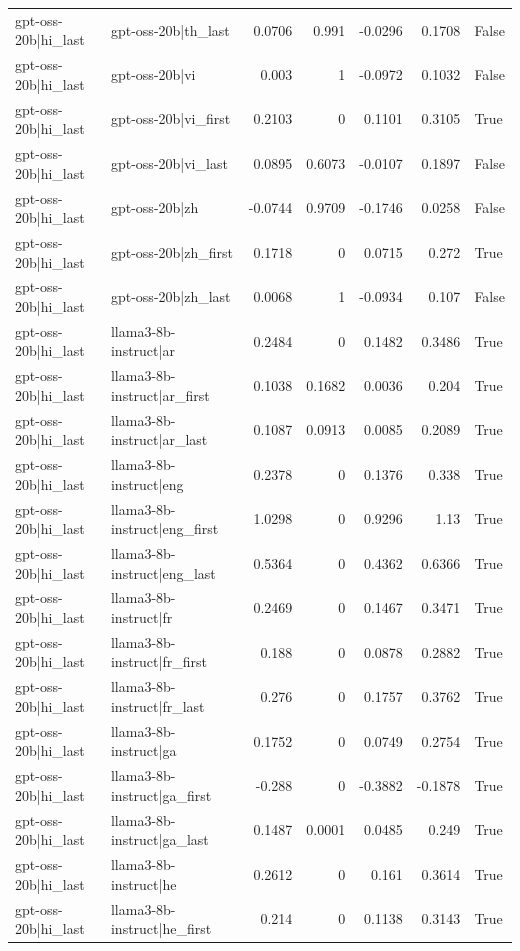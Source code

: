\begin{table}
\begin{tabular}{l l r r r r l}
gpt-oss-20b|hi_last & gpt-oss-20b|th_last & 0.0706 & 0.991 & -0.0296 & 0.1708 & False \\
gpt-oss-20b|hi_last & gpt-oss-20b|vi & 0.003 & 1 & -0.0972 & 0.1032 & False \\
gpt-oss-20b|hi_last & gpt-oss-20b|vi_first & 0.2103 & 0 & 0.1101 & 0.3105 & True \\
gpt-oss-20b|hi_last & gpt-oss-20b|vi_last & 0.0895 & 0.6073 & -0.0107 & 0.1897 & False \\
gpt-oss-20b|hi_last & gpt-oss-20b|zh & -0.0744 & 0.9709 & -0.1746 & 0.0258 & False \\
gpt-oss-20b|hi_last & gpt-oss-20b|zh_first & 0.1718 & 0 & 0.0715 & 0.272 & True \\
gpt-oss-20b|hi_last & gpt-oss-20b|zh_last & 0.0068 & 1 & -0.0934 & 0.107 & False \\
gpt-oss-20b|hi_last & llama3-8b-instruct|ar & 0.2484 & 0 & 0.1482 & 0.3486 & True \\
gpt-oss-20b|hi_last & llama3-8b-instruct|ar_first & 0.1038 & 0.1682 & 0.0036 & 0.204 & True \\
gpt-oss-20b|hi_last & llama3-8b-instruct|ar_last & 0.1087 & 0.0913 & 0.0085 & 0.2089 & True \\
gpt-oss-20b|hi_last & llama3-8b-instruct|eng & 0.2378 & 0 & 0.1376 & 0.338 & True \\
gpt-oss-20b|hi_last & llama3-8b-instruct|eng_first & 1.0298 & 0 & 0.9296 & 1.13 & True \\
gpt-oss-20b|hi_last & llama3-8b-instruct|eng_last & 0.5364 & 0 & 0.4362 & 0.6366 & True \\
gpt-oss-20b|hi_last & llama3-8b-instruct|fr & 0.2469 & 0 & 0.1467 & 0.3471 & True \\
gpt-oss-20b|hi_last & llama3-8b-instruct|fr_first & 0.188 & 0 & 0.0878 & 0.2882 & True \\
gpt-oss-20b|hi_last & llama3-8b-instruct|fr_last & 0.276 & 0 & 0.1757 & 0.3762 & True \\
gpt-oss-20b|hi_last & llama3-8b-instruct|ga & 0.1752 & 0 & 0.0749 & 0.2754 & True \\
gpt-oss-20b|hi_last & llama3-8b-instruct|ga_first & -0.288 & 0 & -0.3882 & -0.1878 & True \\
gpt-oss-20b|hi_last & llama3-8b-instruct|ga_last & 0.1487 & 0.0001 & 0.0485 & 0.249 & True \\
gpt-oss-20b|hi_last & llama3-8b-instruct|he & 0.2612 & 0 & 0.161 & 0.3614 & True \\
gpt-oss-20b|hi_last & llama3-8b-instruct|he_first & 0.214 & 0 & 0.1138 & 0.3143 & True \\

\end{tabular}
\end{table}
